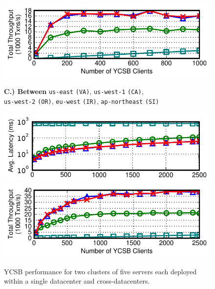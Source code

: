 \begin{figure}[t!]
\includegraphics[width=\figfactor\columnwidth]{figs/finals/2wan-threads-thru.pdf}\vspace{-.75em}
\begin{center}\small \textbf{C.) Between}{ \texttt{us-east} \texttt{(VA)}, \texttt{us-west-1} \texttt{(CA)},\\ \texttt{us-west-2} \texttt{(OR)}, \texttt{eu-west} \texttt{(IR)}, \texttt{ap-northeast} \texttt{(SI)}}\end{center}\vspace{-1.5em}
\includegraphics[width=\figfactor\columnwidth]{figs/finals/5wan-threads-lats-log.pdf}\vspace{--.5em}
\includegraphics[width=\figfactor\columnwidth]{figs/finals/5wan-threads-thru.pdf}
\caption{YCSB performance for two clusters of five servers each
  deployed within a single datacenter and cross-datacenters.}\vspace{-1.5em}
\label{fig:wan-exp}
\end{figure}

